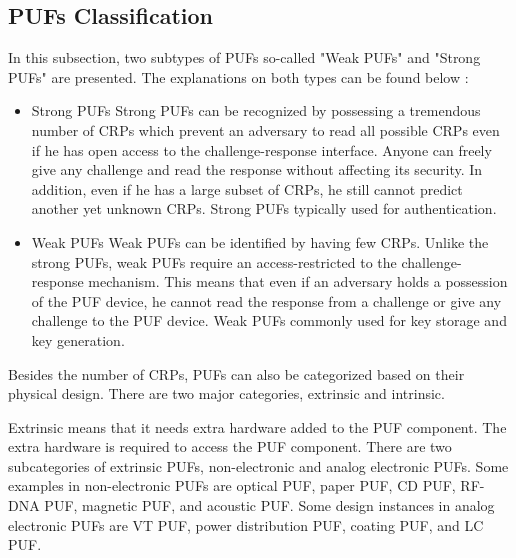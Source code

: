 \subsection{PUFs Classification} \label{lbl:puf-classification}

In this subsection, two subtypes of PUFs so-called "Weak PUFs" and "Strong PUFs" are presented.  The explanations on both types can be found below \cite{6800561}:
\begin{itemize}
\item Strong PUFs\newline
Strong PUFs can be recognized by possessing a tremendous number of CRPs which prevent an adversary to read all possible CRPs even if he has open access to the challenge-response interface. Anyone can freely give any challenge and read the response without affecting its security. In addition, even if he has a large subset of CRPs, he still cannot predict another yet unknown CRPs. Strong PUFs typically used for authentication.
\item Weak PUFs\newline
Weak PUFs can be identified by having few CRPs. Unlike the strong PUFs, weak PUFs require an access-restricted to the challenge-response mechanism. This means that even if an adversary holds a possession of the PUF device, he cannot read the response from a challenge or give any challenge to the PUF device. Weak PUFs commonly used for key storage and key generation.
\end{itemize}

Besides the number of CRPs, PUFs can also be categorized based on their physical design. There are two major categories, extrinsic and intrinsic.

Extrinsic means that it needs extra hardware added to the PUF component. The extra hardware is required to access the PUF component. There are two subcategories of extrinsic PUFs, non-electronic and analog electronic PUFs. Some examples in non-electronic PUFs are optical PUF, paper PUF, CD PUF, RF-DNA PUF, magnetic PUF, and acoustic PUF. Some design instances in analog electronic PUFs are VT PUF, power distribution PUF, coating PUF, and LC PUF.

